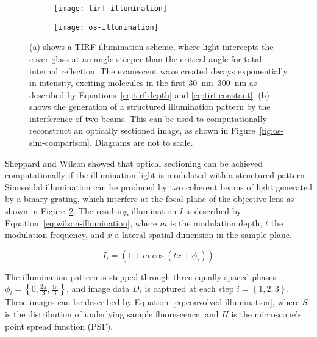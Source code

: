 \begin{figure}[tbp]
\centering
\begin{subfigure}[b]{0.49\textwidth}
	\texttt{[image: tirf-illumination]}
	\caption{}\label{fig:tirf-illumination}
\end{subfigure}
\hfill
\begin{subfigure}[b]{0.49\textwidth}
	\texttt{[image: os-illumination]}
	\caption{}\label{fig:os-illumination}
\end{subfigure}
\caption[LAG SIM: Both TIRF microscopy and structured illumination patterns can be used to remove out-of-focus light]{(a) shows a TIRF illumination scheme, where light intercepts the cover glass at an angle steeper than the critical angle for total internal reflection. The evanescent wave created decays exponentially in intensity, exciting molecules in the first \SIrange[range-phrase=--]{30}{300}{\nano\metre} as described by Equations~\ref{eq:tirf-depth} and \ref{eq:tirf-constant}. (b) shows the generation of a structured illumination pattern by the interference of two beams. This can be used to computationally reconstruct an optically sectioned image, as shown in Figure~\ref{fig:os-sim-comparison}. Diagrams are not to scale. }
\label{fig:os-sim-diagrams}
\end{figure}

Sheppard and Wilson showed that optical sectioning can be achieved computationally if the illumination light is modulated with a structured pattern~\cite{pawley2012handbook, neil1997method}.
Sinusoidal illumination can be produced by two coherent beams of light generated by a binary grating, which interfere at the focal plane of the objective lens as shown in Figure~\ref{fig:os-illumination}.
The resulting illumination $I$ is described by Equation~\ref{eq:wilson-illumination}, where $m$ is the modulation depth, $t$ the modulation frequency, and $x$ a lateral spatial dimension in the sample plane.

\begin{equation} \label{eq:wilson-illumination}
I_i = \left( 1 + m \cos \left(t x + \phi_i \right) \right)
\end{equation}

The illumination pattern is stepped through three equally-spaced phases $\phi_i = \left\lbrace0, \frac{2\pi}{3}, \frac{4\pi}{3}\right\rbrace$, and image data $D_i$ is captured at each step $i=\left\lbrace1,2,3\right\rbrace$.
These images can be described by Equation~\ref{eq:convolved-illumination}, where $S$ is the distribution of underlying sample fluorescence, and $H$ is the microscope's point spread function (PSF). 

